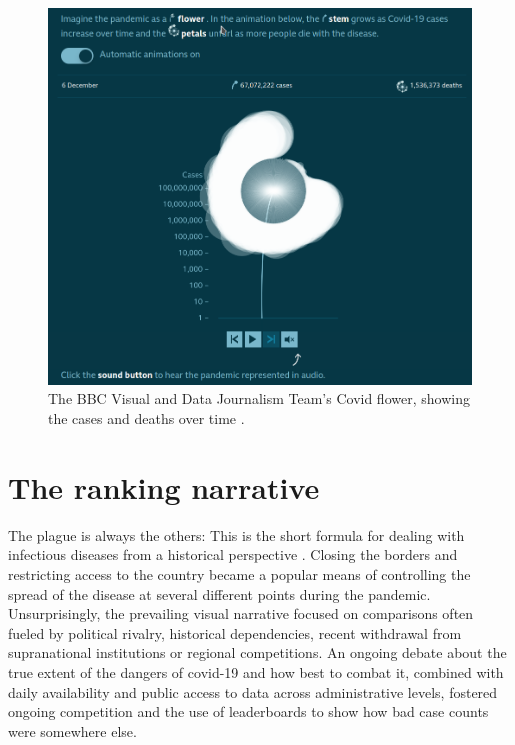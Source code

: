 \documentclass[article]{jdssv}\usepackage[]{graphicx}\usepackage[]{xcolor}
\begin{document}
\begin{figure}
\centering
\includegraphics[width=.8\linewidth]{Figures_Web/BBC_flower_time_series}
\caption{The BBC Visual and Data Journalism Team's Covid flower, showing the cases and deaths over time \citep{thebbcvisualanddatajournalismteamCoronavirusHowCan2020}.}\label{fig:bbc-flower}
\end{figure}


\section{The ranking narrative}
\label{sec:rankings}

The plague is always the others: This is the short formula for dealing with infectious diseases from a historical perspective \citep{thiessen2021}. Closing the borders and restricting access to the country became a popular means of controlling the spread of the disease at several different points during the pandemic. Unsurprisingly, the prevailing visual narrative focused on comparisons often fueled by political rivalry, historical dependencies, recent withdrawal from supranational institutions or regional competitions. An ongoing debate about the true extent of the dangers of covid-19 and how best to combat it, combined with daily availability and public access to data across administrative levels, fostered ongoing competition and the use of leaderboards to show how bad case counts were somewhere else. 
\end{document}
